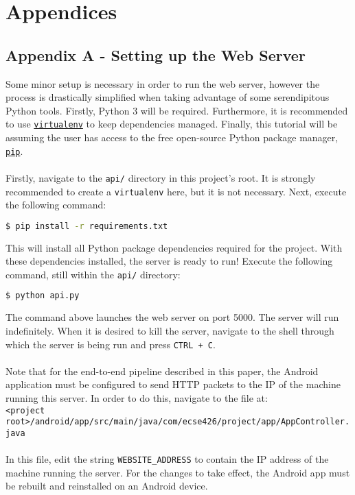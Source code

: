 \section*{Appendices}
\subsection*{Appendix A - Setting up the Web Server}
Some minor setup is necessary in order to run the web server, however the process is drastically
simplified when taking advantage of some serendipitous Python tools. Firstly, Python 3 will be
required. Furthermore, it is recommended to use
\href{https://pypi.org/project/virtualenv/}{\texttt{virtualenv}} to keep dependencies managed.
Finally, this tutorial will be assuming the user has access to the free open-source Python package
manager, \href{https://pypi.org/project/pip}{\texttt{pip}}.\\\\
Firstly, navigate to the \texttt{api/} directory in this project's root. It is strongly recommended
to create a \texttt{virtualenv} here, but it is not necessary. Next, execute the following command:
\begin{lstlisting}[language=bash,basicstyle=\ttfamily]
$ pip install -r requirements.txt
\end{lstlisting}
This will install all Python package dependencies required for the project. With these dependencies
installed, the server is ready to run! Execute the following command, still within the \texttt{api/}
directory:
\begin{lstlisting}[language=bash,basicstyle=\ttfamily]
$ python api.py
\end{lstlisting}
The command above launches the web server on port 5000. The server will run indefinitely. When it is
desired to kill the server, navigate to the shell through which the server is being run and press
\texttt{CTRL + C}.\\\\
Note that for the end-to-end pipeline
described in this paper, the Android application must be configured to send HTTP packets to the IP
of the machine running this server. In order to do this, navigate to the file at:\\
\texttt{<project root>/android/app/src/main/java/com/ecse426/project/app/AppController.java}\\\\
In this file, edit the string \texttt{WEBSITE\_ADDRESS} to contain the IP address of the machine
running the server. For the changes to take effect, the Android app must be rebuilt and reinstalled
on an Android device.

